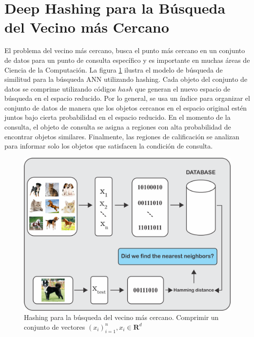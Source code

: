 \section{Deep Hashing para la Búsqueda del Vecino más Cercano}

El problema del vecino más cercano, busca el punto más cercano en un conjunto de datos para un punto de consulta específico y es importante en muchas áreas de Ciencia de la Computación. La figura \ref{searchmodelcap5} ilustra el modelo de búsqueda de similitud para la búsqueda ANN utilizando hashing. Cada objeto del conjunto de datos se comprime utilizando códigos $hash$ que generan el nuevo espacio de búsqueda en el espacio reducido. Por lo general, se usa un índice para organizar el conjunto de datos de manera que los objetos cercanos en el espacio original estén juntos bajo cierta probabilidad en el espacio reducido. En el momento de la consulta, el objeto de consulta se asigna a regiones con alta probabilidad de encontrar objetos similares. Finalmente, las regiones de calificación se analizan para informar solo los objetos que satisfacen la condición de consulta.
\begin{figure}[htp]
\includegraphics[width=0.7\columnwidth]{chapter5/ima1.png}
\centering
\caption{ Hashing para la búsqueda del vecino más cercano. Comprimir un conjunto de vectores  $(x_i)^{n}_{i=1}, x_i \in \mathbf{R}^d $ }
\label{searchmodelcap5}
\end{figure}

